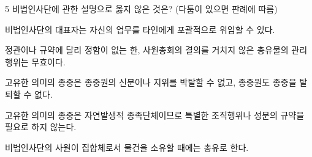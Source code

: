 \begin{question}{5}
비법인사단에 관한 설명으로 옳지 않은 것은? (다툼이 있으면 판례에 따름)
\begin{choices}
  \item 비법인사단의 대표자는 자신의 업무를 타인에게 포괄적으로 위임할 수 있다.
  \item 정관이나 규약에 달리 정함이 없는 한, 사원총회의 결의를 거치지 않은 총유물의 관리행위는 무효이다.
  \item 고유한 의미의 종중은 종중원의 신분이나 지위를 박탈할 수 없고, 종중원도 종중을 탈퇴할 수 없다.
  \item 고유한 의미의 종중은 자연발생적 종족단체이므로 특별한 조직행위나 성문의 규약을 필요로 하지 않는다.
  \item 비법인사단의 사원이 집합체로서 물건을 소유할 때에는 총유로 한다.
\end{choices}
\end{question}
